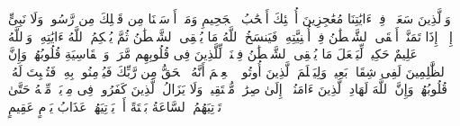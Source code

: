 \stopbuffer
\startbuffer[\q:22:51]
وَٱلَّذِینَ سَعَوۡا۟ فِیۤ ءَایَٰتِنَا مُعَٰجِزِینَ أُو۟لَٰۤئِكَ أَصۡحَٰبُ ٱلۡجَحِیمِ%
\stopbuffer
\startbuffer[\q:22:52]
وَمَاۤ أَرۡسَلۡنَا مِن قَبۡلِكَ مِن رَّسُولࣲ وَلَا نَبِیٍّ إِلَّاۤ إِذَا تَمَنَّىٰۤ أَلۡقَى ٱلشَّیۡطَٰنُ فِیۤ أُمۡنِیَّتِهِۦ فَیَنسَخُ ٱللَّهُ مَا یُلۡقِی ٱلشَّیۡطَٰنُ ثُمَّ یُحۡكِمُ ٱللَّهُ ءَایَٰتِهِۦۗ وَٱللَّهُ عَلِیمٌ حَكِیمࣱ%
\stopbuffer
\startbuffer[\q:22:53]
لِّیَجۡعَلَ مَا یُلۡقِی ٱلشَّیۡطَٰنُ فِتۡنَةࣰ لِّلَّذِینَ فِی قُلُوبِهِم مَّرَضࣱ وَٱلۡقَاسِیَةِ قُلُوبُهُمۡۗ وَإِنَّ ٱلظَّٰلِمِینَ لَفِی شِقَاقِۭ بَعِیدࣲ%
\stopbuffer
\startbuffer[\q:22:54]
وَلِیَعۡلَمَ ٱلَّذِینَ أُوتُوا۟ ٱلۡعِلۡمَ أَنَّهُ ٱلۡحَقُّ مِن رَّبِّكَ فَیُؤۡمِنُوا۟ بِهِۦ فَتُخۡبِتَ لَهُۥ قُلُوبُهُمۡۗ وَإِنَّ ٱللَّهَ لَهَادِ ٱلَّذِینَ ءَامَنُوۤا۟ إِلَىٰ صِرَٰطࣲ مُّسۡتَقِیمࣲ%
\stopbuffer
\startbuffer[\q:22:55]
وَلَا یَزَالُ ٱلَّذِینَ كَفَرُوا۟ فِی مِرۡیَةࣲ مِّنۡهُ حَتَّىٰ تَأۡتِیَهُمُ ٱلسَّاعَةُ بَغۡتَةً أَوۡ یَأۡتِیَهُمۡ عَذَابُ یَوۡمٍ عَقِیمٍ%
\stopbuffer
